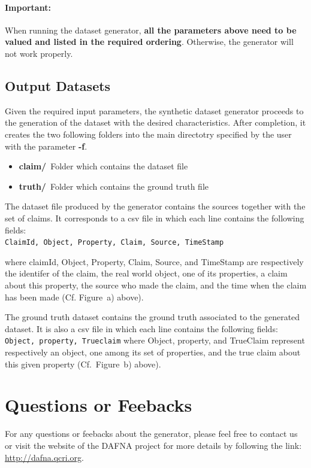 \documentclass[a4paper,10pt]{scrartcl}
\newcommand{\claim}[1]{\vspace*{0.5cm}\\\indent\indent\texttt{#1}\vspace*{0.5cm}}
\begin{document}
\paragraph{Important:}When running the dataset generator, \textbf{all the parameters above need to be valued and listed in the required ordering}.
Otherwise, the generator will not work properly.

\subsection{Output Datasets}
Given the required input parameters, the synthetic dataset generator proceeds to the generation 
of the dataset with the desired characteristics. After completion, it creates the two following
folders into the main directotry specified by the user with the parameter \textbf{-f}.
\begin{itemize}
 \item \textbf{claim/}~Folder which contains the dataset file 
 \item \textbf{truth/}~Folder which contains the ground truth file
\end{itemize}

The dataset file produced by the generator contains the sources together with the set of claims.
It corresponds to a csv file in which each line	contains the following fields:
\claim{ClaimId, Object, Property, Claim, Source, TimeStamp}

\noindent where claimId, Object, Property, Claim, Source, and TimeStamp are respectively the identifer of the claim,
the real world object, one of its properties, a claim about this property, the source who made the claim, and
the time when the claim has been made (Cf. Figure~a) above).

The ground truth dataset contains the ground truth associated to the generated dataset. It is also a csv file in which each line
contains the following fields:
\claim{Object, property, Trueclaim}
where Object, property, and TrueClaim represent respectively an object, one among its set of properties, and the true claim about
this given property (Cf.\ Figure~b) above).

\section{Questions or Feebacks}
For any questions or feebacks about the generator, please feel free to contact us 
or visit the website of the DAFNA project for more details by following the link:
\href{http://dafna.qcri.org}{http://dafna.qcri.org}.
\end{document}
